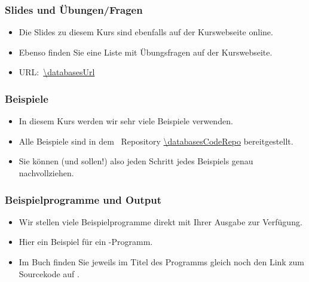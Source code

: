 \documentclass[aspectratio=169,mathserif,notheorems]{beamer}%
\begin{document}
%
\begin{frame}%
\frametitle{Slides und Übungen/Fragen}%
\begin{itemize}%
\item Die Slides zu diesem Kurs sind ebenfalls auf der Kurswebseite online.%
\item<2-> Ebenso finden Sie eine Liste mit Übungsfragen auf der Kurswebseite.%
\item<2-> URL:~\expandafter\url{\databasesUrl}%
\end{itemize}%
\end{frame}%
%
\begin{frame}%
\frametitle{Beispiele}%
\begin{itemize}%
\item In diesem Kurs werden wir sehr viele Beispiele verwenden.%
\item<7-> Alle Beispiele sind in dem \github~Repository \expandafter\url{\databasesCodeRepo} bereitgestellt.%
\item<8-> Sie können (und sollen!) also jeden Schritt jedes Beispiels genau nachvollziehen.%
\end{itemize}%
\end{frame}%
%
\begin{frame}[t]
\frametitle{Beispielprogramme und Output}%
\begin{itemize}%
\item Wir stellen viele Beispielprogramme direkt mit Ihrer Ausgabe zur Verfügung. %
\item<2-> Hier ein Beispiel für ein \python-Programm.%
\item<4-> Im Buch finden Sie jeweils im Titel des Programms gleich noch den Link zum Sourcekode auf \github.%
\end{itemize}%
%
%
%
%
\end{frame}
\end{document}
